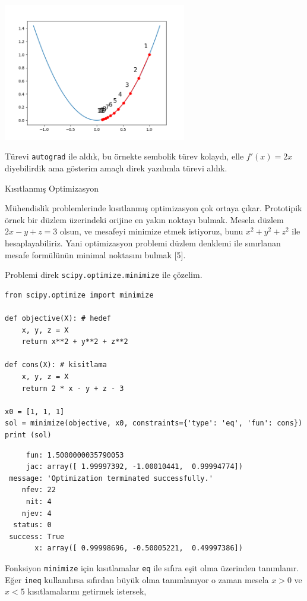 \documentclass[12pt,fleqn]{article}\usepackage{../../common}
\begin{document}
\includegraphics[height=6cm]{func_40_autograd_02.png}

Türevi \verb!autograd! ile aldık, bu örnekte sembolik türev kolaydı, elle
$f'(x)=2x$ diyebilirdik ama gösterim amaçlı direk yazılımla türevi aldık.

Kısıtlanmış Optimizasyon

Mühendislik problemlerinde kısıtlanmış optimizasyon çok ortaya
çıkar. Prototipik örnek bir düzlem üzerindeki orijine en yakın noktayı
bulmak. Mesela düzlem $2x - y + z = 3$ olsun, ve mesafeyi minimize etmek
istiyoruz, bunu $x^2+y^2+z^2$ ile hesaplayabiliriz. Yani optimizasyon
problemi düzlem denklemi ile sınırlanan mesafe formülünün minimal noktasını
bulmak [5]. 

Problemi direk \verb!scipy.optimize.minimize! ile çözelim. 

\begin{verbatim}
from scipy.optimize import minimize

def objective(X): # hedef
    x, y, z = X
    return x**2 + y**2 + z**2

def cons(X): # kisitlama
    x, y, z = X
    return 2 * x - y + z - 3

x0 = [1, 1, 1]
sol = minimize(objective, x0, constraints={'type': 'eq', 'fun': cons})
print (sol)
\end{verbatim}

\begin{verbatim}
     fun: 1.5000000035790053
     jac: array([ 1.99997392, -1.00010441,  0.99994774])
 message: 'Optimization terminated successfully.'
    nfev: 22
     nit: 4
    njev: 4
  status: 0
 success: True
       x: array([ 0.99998696, -0.50005221,  0.49997386])
\end{verbatim}

Fonksiyon \verb!minimize! için kısıtlamalar \verb!eq! ile sıfıra eşit olma
üzerinden tanımlanır. Eğer \verb!ineq! kullanılırsa sıfırdan büyük olma
tanımlanıyor o zaman mesela $x>0$ ve $x<5$ kısıtlamalarını getirmek
istersek, 
\end{document}
